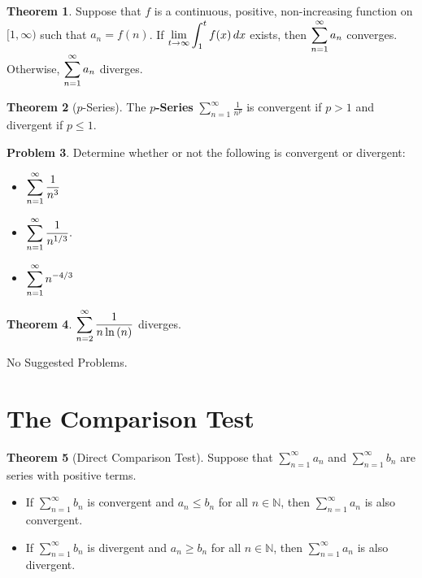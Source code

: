 \documentclass[letterpaper, twoside, 12pt]{book}
\theoremstyle{definition}
\newtheorem{theorem}{Theorem}
\theoremstyle{definition}
\newtheorem{problem}[theorem]{Problem}
\newcommand{\ds}{\ensuremath{\displaystyle}}
\begin{document}
\begin{theorem}
 Suppose that $f$ is a continuous, positive, non-increasing function on
 $[1, \infty)$ such that $a_n = f(n)$.
 If $\ds\lim_{t \rightarrow \infty} \int_1^t f(x) \, dx$ exists,
 then $\ds\sum_{n=1}^{\infty} a_n$ converges.
 Otherwise, $\ds\sum_{n=1}^{\infty} a_n$ diverges.
\end{theorem}

\begin{theorem}[$p$-Series]
 The \textbf{$p$-Series} $\sum_{n=1}^{\infty} \frac{1}{n^p}$ is convergent if $p > 1$ and divergent if $p \leq 1$.
\end{theorem}

\begin{problem}
 Determine whether or not the following is convergent or divergent:
 \begin{itemize}
  \item $\ds \sum_{n=1}^{\infty} \frac{1}{n^3}$
  \item $\ds \sum_{n=1}^{\infty} \frac{1}{n^{1/3}}.$
  \item $\ds \sum_{n=1}^\infty n^{-{4/3}}$
 \end{itemize}
\end{problem}

\vfill

\begin{theorem}
 $\ds \sum_{n=2}^{\infty} \frac{1}{n\ln\left(n\right)}$ diverges.
\end{theorem}

\noindent No Suggested Problems.

\newpage

\section{The Comparison Test}

\begin{theorem}[Direct Comparison Test]
 Suppose that $\sum_{n=1}^{\infty} a_n$ and $\sum_{n=1}^{\infty} b_n$ are series with positive terms.
 \begin{itemize}
  \item If $\sum_{n=1}^{\infty} b_n$ is convergent and $a_n \leq b_n$ for all $n \in \mathbb{N}$, then $\sum_{n=1}^{\infty} a_n$ is also convergent.
  \item If $\sum_{n=1}^{\infty} b_n$ is divergent and $a_n \geq b_n$ for all $n \in \mathbb{N}$, then $\sum_{n=1}^{\infty} a_n$ is also divergent.
 \end{itemize}
\end{theorem}
\end{document}
